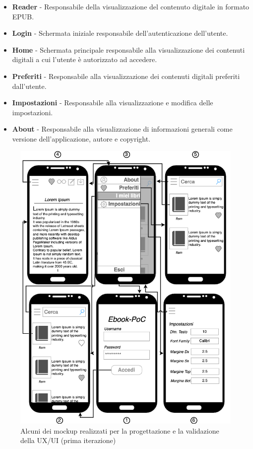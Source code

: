 \begin{itemize}
    \item \textbf{Reader} - Responsabile della visualizzazione del contenuto digitale in formato EPUB.
    
    \item \textbf{Login} - Schermata iniziale responsabile dell'autenticazione dell'utente.
    
    \item \textbf{Home} - Schermata principale responsabile alla visualizzazione dei contenuti digitali a cui l'utente è autorizzato ad accedere.
    
    \item \textbf{Preferiti} - Responsabile alla visualizzazione dei contenuti digitali preferiti dall'utente.
    
    \item \textbf{Impostazioni} - Responsabile alla visualizzazione e modifica delle impostazioni.
    
    \item \textbf{About} - Responsabile alla visualizzazione di informazioni generali come versione dell'applicazione, autore e copyright.
\end{itemize}

\begin{figure}[H]
    \centering
    \includegraphics[width=1\textwidth]{img/mockup-uiux-1.png}
    \caption{Alcuni dei mockup realizzati per la progettazione e la validazione della UX/UI (prima iterazione)}
\end{figure}

